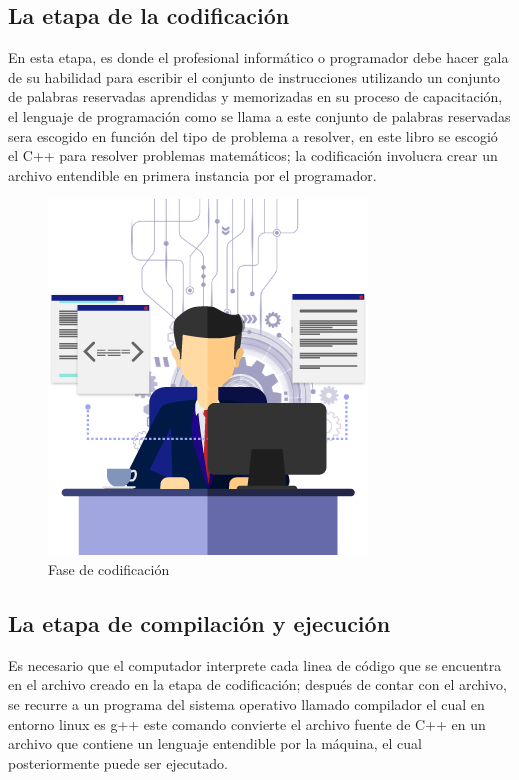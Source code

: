 \documentclass[a4paper,12pt,spanish]{article}
\begin{document}
\subsection{La etapa de la codificación}
\label{sec:la-etapa-de}

En esta etapa, es donde el profesional informático o programador debe
hacer gala de su habilidad para escribir el conjunto de instrucciones
utilizando un conjunto de palabras reservadas aprendidas y memorizadas
en su proceso de capacitación, el lenguaje de programación como se
llama a este conjunto de palabras reservadas sera escogido en función
del tipo de problema a resolver, en este libro se escogió el C++ para
resolver problemas matemáticos; la codificación involucra crear un
archivo entendible en primera instancia por el programador.

\begin{figure}[H]
  \centering
  \includegraphics[scale=0.2]{programador}
  \caption{Fase de codificación}
  \label{fig:codificacion}
\end{figure}

\subsection{La etapa de compilación y ejecución}
\label{sec:la-etapa-de-1}

Es necesario que el computador interprete cada linea de código que se
encuentra en el archivo creado en la etapa de codificación; después de
contar con el archivo, se recurre a un programa del sistema operativo
llamado compilador el cual en entorno linux es g++ este comando
convierte el archivo fuente de C++ en un archivo que contiene un
lenguaje entendible por la máquina, el cual posteriormente puede ser
ejecutado.
\end{document}
